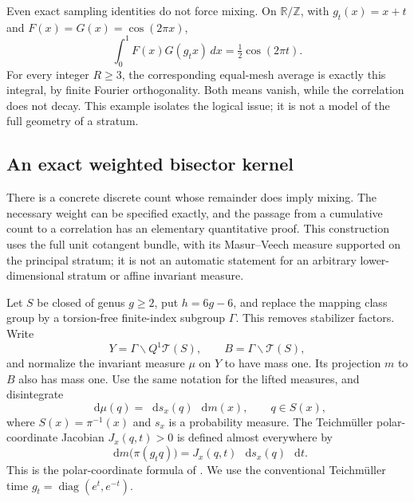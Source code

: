\documentclass[11pt,a4paper]{article}
\numberwithin{equation}{section}
\theoremstyle{definition}
\theoremstyle{remark}
\DeclareMathOperator{\diag}{diag}
\newcommand{\dd}{\mathop{}\!\mathrm d}
\newcommand{\T}{\mathcal T}
\begin{document}
Even exact sampling identities do not force mixing.  On
$\mathbb R/\mathbb Z$, with $g_t(x)=x+t$ and
$F(x)=G(x)=\cos(2\pi x)$,
\[
 \int_0^1F(x)G(g_tx)\,dx=\tfrac12\cos(2\pi t).
\]
For every integer $R\geq3$, the corresponding equal-mesh average is exactly
this integral, by finite Fourier orthogonality.  Both means vanish, while the
correlation does not decay.  This example isolates the logical issue; it is
not a model of the full geometry of a stratum.



\subsection{An exact weighted bisector kernel}
\label{subsec:twopointkernel}

There is a concrete discrete count whose remainder does imply mixing.
The necessary weight can be specified exactly, and the passage from a
cumulative count to a correlation has an elementary quantitative proof.
This construction uses the full unit cotangent bundle, with its
Masur--Veech measure supported on the principal stratum; it is not an
automatic statement for an arbitrary lower-dimensional stratum or
affine invariant measure.

Let $S$ be closed of genus $g\geq2$, put $h=6g-6$, and replace the
mapping class group by a torsion-free finite-index subgroup $\Gamma$.
This removes stabilizer factors. Write
\[
 Y=\Gamma\backslash Q^1\T(S),\qquad
 B=\Gamma\backslash\T(S),
\]
and normalize the invariant measure $\mu$ on $Y$ to have mass one.
Its projection $m$ to $B$ also has mass one. Use the same notation for
the lifted measures, and disintegrate
\[
 \dd\mu(q)=\dd s_x(q)\,\dd m(x),\qquad q\in S(x),
\]
where $S(x)=\pi^{-1}(x)$ and $s_x$ is a probability measure. The
Teichm\"uller polar-coordinate Jacobian $J_x(q,t)>0$ is defined almost
everywhere by
\begin{equation}
 \dd m\bigl(\pi(g_tq)\bigr)
   =J_x(q,t)\,\dd s_x(q)\,\dd t.
 \label{eq:twopointpolar}
\end{equation}
This is the polar-coordinate formula of
\cite[Section 2.4, equation (2.3)]{ABEMPolar}. We use the conventional
Teichm\"uller time $g_t=\diag(e^t,e^{-t})$.
\end{document}

